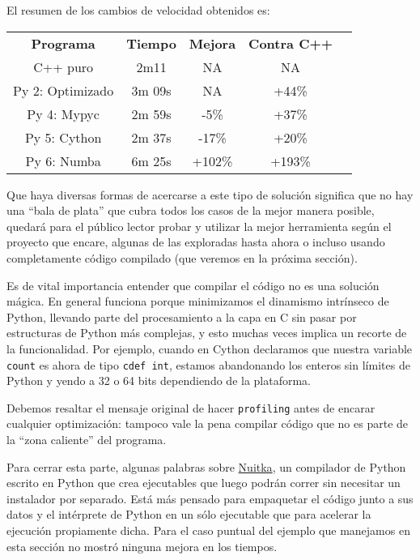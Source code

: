 El resumen de los cambios de velocidad obtenidos es:

\begin{center}
 \begin{tabular} {ccccc}
 \toprule
  \textbf{Programa} & \textbf{Tiempo} & \textbf{Mejora} & \textbf{Contra C++} \\
  C++ puro & 2m11 & NA & NA \\
  Py 2: Optimizado & 3m 09s & NA & +44\% \\
  Py 4: Mypyc & 2m 59s & -5\% & +37\% \\
  Py 5: Cython & 2m 37s & -17\% & +20\% \\
  Py 6: Numba & 6m 25s & +102\% & +193\% \\
  \bottomrule
 \end{tabular}
\end{center}

Que haya diversas formas de acercarse a este tipo de solución significa que no hay una ``bala de plata'' que cubra todos los casos de la mejor manera posible, quedará para el público lector probar y utilizar la mejor herramienta según el proyecto que encare, algunas de las exploradas hasta ahora o incluso usando completamente código compilado (que veremos en la próxima sección).

Es de vital importancia entender que compilar el código no es una solución mágica. En general funciona porque minimizamos el dinamismo intrínseco de Python, llevando parte del procesamiento a la capa en C sin pasar por estructuras de Python más complejas, y esto muchas veces implica un recorte de la funcionalidad. Por ejemplo, cuando en Cython declaramos que nuestra variable \texttt{count} es ahora de tipo \texttt{cdef int}, estamos abandonando los enteros sin límites de Python y yendo a 32 o 64 bits dependiendo de la plataforma.

Debemos resaltar el mensaje original de hacer \texttt{profiling} antes de encarar cualquier optimización: tampoco vale la pena compilar código que no es parte de la ``zona caliente'' del programa.

Para cerrar esta parte, algunas palabras sobre \href{https://nuitka.net}{Nuitka}, un compilador de Python escrito en Python que crea ejecutables que luego podrán correr sin necesitar un instalador por separado. Está más pensado para empaquetar el código junto a sus datos y el intérprete de Python en un sólo ejecutable que para acelerar la ejecución propiamente dicha. Para el caso puntual del ejemplo que manejamos en esta sección no mostró ninguna mejora en los tiempos.


